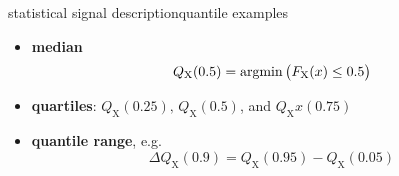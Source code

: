         \begin{frame}{statistical signal description}{quantile examples}
			\begin{itemize}
				\item	\textbf{median}
						\begin{equation*}\label{eq:median}
							Q_\mathrm{X}(0.5) = \operatorname*{argmin}\big (F_\mathrm{X}(x) \leq 0.5\big)
						\end{equation*}
				\bigskip
				\item	\textbf{quartiles}: $Q_\mathrm{X}(0.25),\, Q_\mathrm{X}(0.5)$, and $Q_\mathrm{X}x(0.75)$
				\bigskip
                \item	\textbf{quantile range}, e.g.
						\begin{equation*}
							\Delta Q_\mathrm{X}(0.9) = Q_\mathrm{X}(0.95)-Q_\mathrm{X}(0.05)
						\end{equation*}
			\end{itemize}
        \end{frame}
        
